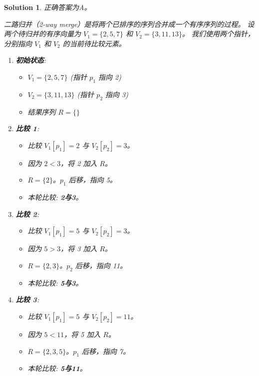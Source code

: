 \documentclass[UTF8]{report}
\newtheorem{solution}{Solution}
\theoremstyle{MyLineTheoremStyle} %
\theoremstyle{MyBlockTheoremStyle} %
\theoremstyle{MySubsubsectionStyle} %
\begin{document}
\begin{solution}
正确答案为A。

二路归并（2-way merge）是将两个已排序的序列合并成一个有序序列的过程。
设两个待归并的有序向量为 $V_1 = \{2, 5, 7\}$ 和 $V_2 = \{3, 11, 13\}$。
我们使用两个指针，分别指向 $V_1$ 和 $V_2$ 的当前待比较元素。

\begin{enumerate}
    \item \textbf{初始状态}:
    \begin{itemize}
        \item $V_1 = \{2, 5, 7\}$ (指针 $p_1$ 指向 2)
        \item $V_2 = \{3, 11, 13\}$ (指针 $p_2$ 指向 3)
        \item 结果序列 $R = \{\}$
    \end{itemize}

    \item \textbf{比较 1}:
    \begin{itemize}
        \item 比较 $V_1[p_1]=2$ 与 $V_2[p_2]=3$。
        \item 因为 $2 < 3$，将 2 加入 $R$。
        \item $R = \{2\}$。$p_1$ 后移，指向 5。
        \item 本轮比较: \textbf{2与3}。
    \end{itemize}

    \item \textbf{比较 2}:
    \begin{itemize}
        \item 比较 $V_1[p_1]=5$ 与 $V_2[p_2]=3$。
        \item 因为 $5 > 3$，将 3 加入 $R$。
        \item $R = \{2, 3\}$。$p_2$ 后移，指向 11。
        \item 本轮比较: \textbf{5与3}。
    \end{itemize}

    \item \textbf{比较 3}:
    \begin{itemize}
        \item 比较 $V_1[p_1]=5$ 与 $V_2[p_2]=11$。
        \item 因为 $5 < 11$，将 5 加入 $R$。
        \item $R = \{2, 3, 5\}$。$p_1$ 后移，指向 7。
        \item 本轮比较: \textbf{5与11}。
    \end{itemize}


\end{enumerate}
\end{solution}
\end{document}
